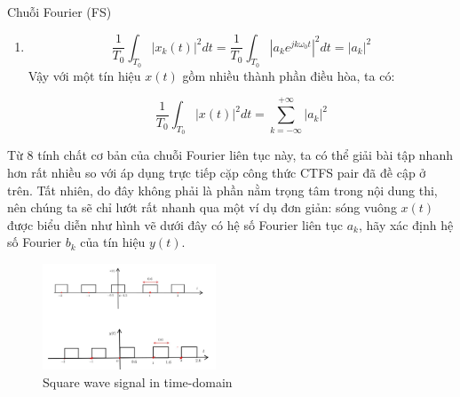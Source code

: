 \documentclass[8pt]{beamer}
\begin{document}
\begin{frame}{Chuỗi Fourier (FS)}
	\begin{enumerate}
		\item[]
	$$\frac{1}{T_{0}}\int_{T_{0}}|x_{k}(t)|^2dt=\frac{1}{T_{0}}\int_{T_{0}}|a_{k} e^{jk\omega_{0}t}|^2dt=|a_{k}|^2$$
	Vậy với một tín hiệu $x(t)$ gồm nhiều thành phần điều hòa, ta có:

$$\frac{1}{T_{0}}\int_{T_{0}}|x(t)|^2dt=\sum_{k=-\infty}^{+\infty}|a_{k}|^2$$
\end{enumerate}
Từ 8 tính chất cơ bản của chuỗi Fourier liên tục này, ta có thể giải bài tập nhanh hơn rất nhiều so với áp dụng trực tiếp cặp công thức CTFS pair đã đề cập ở trên. Tất nhiên, do đây không phải là phần nằm trọng tâm trong nội dung thi, nên chúng ta sẽ chỉ lướt rất nhanh qua một ví dụ đơn giản: 
sóng vuông $x(t)$ được biểu diễn như hình vẽ dưới đây có hệ số Fourier liên tục $a_{k}$, hãy xác định hệ số Fourier $b_{k}$ của tín hiệu $y(t)$.
\begin{figure}[h]
			\includegraphics[width=0.46\textwidth]{pro.jpg}
			\caption{Square wave signal in time-domain}\label{fig:re11}

		\end{figure}

\end{frame}
\end{document}
